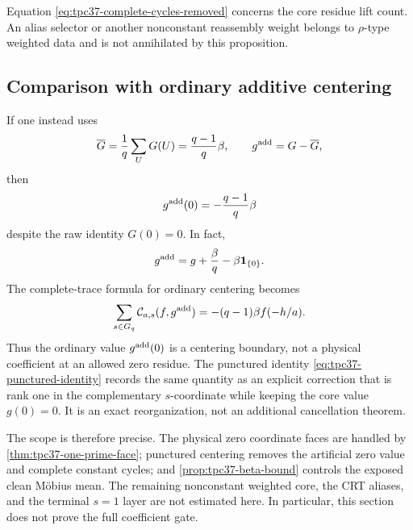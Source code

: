 Equation \eqref{eq:tpc37-complete-cycles-removed} concerns the core
residue lift count.  An alias selector or another nonconstant reassembly
weight belongs to \(\rho\)-type weighted data and is not annihilated by
this proposition.

\subsection{Comparison with ordinary additive centering}

If one instead uses
\begin{equation}
 \overline G=\frac1q\sum_U G(U)=\frac{q-1}{q}\beta,
 \qquad
 g^{\rm add}=G-\overline G,
 \label{eq:tpc37-ordinary-g-centering}
\end{equation}
then
\begin{equation}
 g^{\rm add}(0)=-\frac{q-1}{q}\beta
 \label{eq:tpc37-ordinary-centered-zero}
\end{equation}
despite the raw identity \(G(0)=0\).  In fact,
\begin{equation}
 g^{\rm add}
 =g+\frac\beta q-\beta\mathbf 1_{\{0\}}.
 \label{eq:tpc37-two-centerings-comparison}
\end{equation}
The complete-trace formula for ordinary centering becomes
\begin{equation}
 \sum_{s\in G_q}
 \mathcal C_{a,s}(f,g^{\rm add})
 =-(q-1)\beta f(-h/a).
 \label{eq:tpc37-ordinary-complete-trace}
\end{equation}
Thus the ordinary value \(g^{\rm add}(0)\) is a centering boundary, not a
physical coefficient at an allowed zero residue.  The punctured identity
\eqref{eq:tpc37-punctured-identity} records the same quantity as an
explicit correction that is rank one in the complementary
\(s\)-coordinate while keeping the core value \(g(0)=0\).
It is an exact reorganization, not an additional cancellation theorem.

The scope is therefore precise.  The physical zero coordinate faces are
handled by \cref{thm:tpc37-one-prime-face}; punctured centering removes
the artificial zero value and complete constant cycles; and
\cref{prop:tpc37-beta-bound} controls the exposed clean M\"obius mean.
The remaining nonconstant weighted core, the CRT aliases, and the
terminal \(s=1\) layer are not estimated here.  In particular, this
section does not prove the full coefficient gate.
